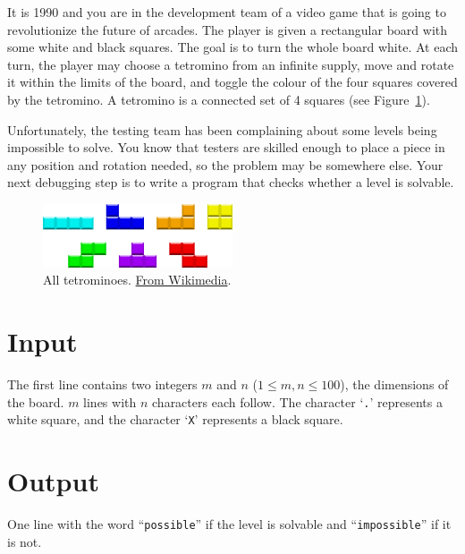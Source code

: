 

It is 1990 and you are in the development team of a video game that is
going to revolutionize the future of arcades. The player is given a
rectangular board with some white and black squares. The goal is to
turn the whole board white. At each turn, the player may choose a
tetromino from an infinite supply, move and rotate it within the
limits of the board, and toggle the colour of the four squares covered by
the tetromino. A tetromino is a connected set of 4 squares (see
Figure~\ref{fig:tetrominoes}).

Unfortunately, the testing team has been complaining about some levels
being impossible to solve. You know that testers are skilled enough to
place a piece in any position and rotation needed, so the problem may
be somewhere else. Your next debugging step is to write a program that
checks whether a level is solvable.

\begin{figure}[h]
  \centering
  \includegraphics[width=0.5\textwidth]{Tetrominoes_IJLO_STZ_Worlds}
  \caption{All tetrominoes.
  \href{http://commons.wikimedia.org/wiki/File:Tetrominoes_IJLO_STZ_Worlds.svg}{From Wikimedia}.}
  \label{fig:tetrominoes}
\end{figure}

\section*{Input}
The first line contains two integers $m$ and $n$ ($1 \leq m,n \leq 100$), the dimensions of the
board. $m$ lines with $n$ characters each follow. The character `\verb+.+' represents a white
square, and the character `\verb+X+' represents a black square.

\section*{Output}
One line with the word ``\verb+possible+'' if the level is solvable
and ``\verb+impossible+'' if it is not.

